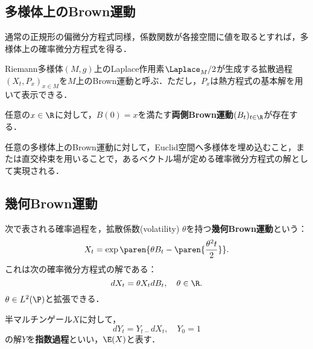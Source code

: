 \documentclass[uplatex,dvipdfmx]{jsreport}
\begin{document}
\subsection{多様体上のBrown運動}

\begin{tcolorbox}[colframe=ForestGreen, colback=ForestGreen!10!white,breakable,colbacktitle=ForestGreen!40!white,coltitle=black,fonttitle=\bfseries\sffamily,
title=]
    通常の正規形の偏微分方程式同様，係数関数が各接空間に値を取るとすれば，多様体上の確率微分方程式を得る．
\end{tcolorbox}

\begin{definition}
    Riemann多様体$(M,g)$上のLaplace作用素$\Laplace_M/2$が生成する拡散過程$(X_t,P_x)_{x\in M}$を$M$上のBrown運動と呼ぶ．ただし，$P_x$は熱方程式の基本解を用いて表示できる．
\end{definition}

\begin{proposition}
    任意の$x\in\R$に対して，$B(0)=x$を満たす\textbf{両側Brown運動}$(B_t)_{t\in\R}$が存在する．
\end{proposition}

\begin{proposition}
    任意の多様体上のBrown運動に対して，Euclid空間へ多様体を埋め込むこと，または直交枠束を用いることで，あるベクトル場が定める確率微分方程式の解として実現される．
\end{proposition}

\subsection{幾何Brown運動}

\begin{definition}\label{def-GBM}
    次で表される確率過程を，拡散係数(volatility) $\theta$を持つ\textbf{幾何Brown運動}という：
    \[X_t=\exp\paren{\theta B_t-\paren{\frac{\theta^2t}{2}}}.\]
    これは次の確率微分方程式の解である：
    \[dX_t=\theta X_tdB_t,\quad \theta\in\R.\]
    $\theta\in L^2(\P)$と拡張できる．
\end{definition}

\begin{definition}
    半マルチンゲール$X$に対して，
    \[dY_t=Y_{t-}dX_t,\quad Y_0=1\]
    の解$Y$を\textbf{指数過程}といい，$\E(X)$と表す．
\end{definition}
\end{document}
